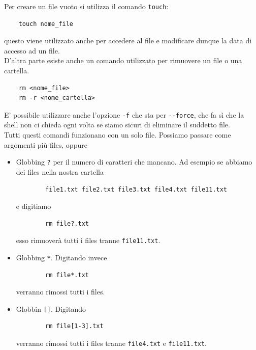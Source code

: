 Per creare un file vuoto si utilizza il comando \verb"touch":
\begin{verbatim}
	touch nome_file
\end{verbatim}
questo viene utilizzato anche per accedere al file e modificare dunque la data di accesso ad un file. \\
D'altra parte esiste anche un comando utilizzato per rimuovere un file o una cartella. 
\begin{verbatim}
	rm <nome_file>
	rm -r <nome_cartella>
\end{verbatim}

E' possibile utilizzare anche l'opzione \verb"-f" che sta per \verb"--force", che fa sì che la shell non ci chieda ogni volta se siamo sicuri di eliminare il suddetto file. \\
Tutti questi comandi funzionano con un solo file. Possiamo passare come argomenti più files, oppure
\begin{itemize}
	\item Globbing \verb"?" per il numero di caratteri che mancano. Ad esempio se abbiamo dei files nella nostra cartella
	\begin{verbatim}
		file1.txt file2.txt file3.txt file4.txt file11.txt
	\end{verbatim}
	e digitiamo 
	\begin{verbatim}
		rm file?.txt
	\end{verbatim}
	esso rimuoverà tutti i files tranne \verb"file11.txt".
	\item Globbing \verb"*". Digitando invece
	\begin{verbatim}
		rm file*.txt
	\end{verbatim}
	verranno rimossi tutti i files.
	\item Globbin \verb"[]". Digitando 
	\begin{verbatim}
		rm file[1-3].txt
	\end{verbatim}
	verranno rimossi tutti i files tranne \verb"file4.txt" e \verb"file11.txt".
\end{itemize}

